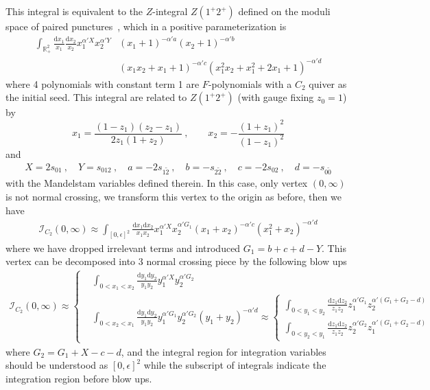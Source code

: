 \documentclass[12pt]{article}
\theoremstyle{definition}
\theoremstyle{plain}
\newcommand{\dif}{\mathrm{d}} %
\begin{document}
This integral is equivalent to the $Z$-integral $Z(1^{+}2^{+})$ defined on the moduli space of paired punctures~\cite{Li:2018mnq}, which in a positive parameterization is 
\begin{align*}
\int_{\mathbb R_+^2} \frac{\dif x_1}{x_1}\frac{\dif x_2}{x_2}x_1^{\alpha' X}x_2^{\alpha' Y}
&(x_1 + 1)^{-\alpha' a} 
(x_2 + 1)^{-\alpha' b}\\
&(x_1x_2 + x_1 + 1)^{-\alpha' c}
(x_1^2x_2 + x_1^2 + 2x_1 + 1)^{-\alpha' d} 
\end{align*}
where 4 polynomials with constant term 1 are $F$-polynomials with a $C_{2}$ quiver as the initial seed.
This integral are related to $Z(1^{+}2^{+})$ (with gauge fixing $z_{0}=1$) by 
\begin{equation*}
	x_{1}=\frac{(1-z_{1})(z_{2}-z_{1})}{2z_{1}(1+z_{2})} \:,\qquad x_{2}=-\frac{(1+z_{1})^{2}}{(1-z_{1})^{2}}
\end{equation*}
and
\begin{align*}
	X=2s_{01}\:,\quad Y=s_{012}\:,\quad a=-2s_{1\tilde{2}}\:,\quad b=-s_{2\tilde{2}}\:,\quad 
	c=-2s_{02}\:,\quad d=-s_{0\tilde{0}}
\end{align*}
with the Mandelstam variables defined therein. In this case, only vertex $(0,\infty)$ is not normal crossing, we transform this vertex to the origin as before, then we have
\begin{align*}
	\mathcal{I}_{C_{2}}(0,\infty)\approx \int_{[0,\epsilon]^{2}} \frac{\dif x_{1}\dif x_{2}}{x_{1}x_{2}} x_{1}^{\alpha' X}x_{2}^{\alpha' G_{1}}
	(x_{1}+x_{2})^{-\alpha' c} (x_{1}^{2}+x_{2})^{-\alpha' d}
\end{align*}
where we have dropped irrelevant terms and introduced $G_{1}=b+c+d-Y$. This vertex can be decomposed into 3 normal crossing piece by the following blow ups
\begin{align*}
	\mathcal{I}_{C_{2}}(0,\infty)\approx\left\{
	\begin{aligned}
		&\int_{0<x_{1}<x_{2}}\frac{\dif y_{1}\dif y_{2}}{y_{1}y_{2}} y_{1}^{\alpha' X}y_{2}^{\alpha' G_{2}} \\
		&\int_{0<x_{2}<x_{1}}\frac{\dif y_{1}\dif y_{2}}{y_{1}y_{2}} y_{1}^{\alpha' G_{1}}y_{2}^{\alpha' G_{2}}(y_{1}+y_{2})^{-\alpha'd} \approx
		\left\{\begin{aligned}
			\int_{0<y_{1}<y_{2}}\frac{\dif z_{1} \dif z_{2}}{z_{1}z_{2}}z_{1}^{\alpha' G_{1}}
			z_{2}^{\alpha'(G_{1}+G_{2}-d)} \\
			\int_{0<y_{2}<y_{1}}\frac{\dif z_{1}\dif z_{2}}{z_{1}z_{2}} z_{2}^{\alpha' G_{2}}
			z_{1}^{\alpha'(G_{1}+G_{2}-d)}
		\end{aligned} \right. 
	\end{aligned} \right.
\end{align*}
where $G_{2}=G_{1}+X-c-d$, and the integral region for integration variables should be understood as $[0,\epsilon]^{2}$ while the subscript of integrals indicate the integration region before blow ups.
\end{document}
